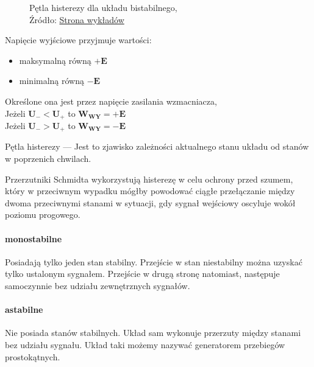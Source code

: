 \documentclass{article}
\begin{document}
\begin{figure}[!ht]
\begin{minipage}{.5\textwidth}
              \caption{Pętla histerezy dla układu bistabilnego,
              \\Źródło: \href{https://spe.if.uj.edu.pl/literatura}{Strona wykładów}}
              \label{fig7:histereza}
            \end{minipage}
            \end{figure}

          Napięcie wyjściowe przyjmuje wartości:
          \begin{itemize}
            \item maksymalną równą $\mathbf{+E}$
            \item minimalną równą $\mathbf{-E}$
          \end{itemize}

          Określone ona jest przez napięcie zasilania wzmacniacza, \\
          Jeżeli $\mathbf{U_- < U_+}$ to $\mathbf{W_{WY} = + E}$ \\
          Jeżeli $\mathbf{U_- > U_+}$ to $\mathbf{W_{WY} = - E}$ \\
          \pagebreak

          Pętla histerezy --- Jest to zjawisko zależności aktualnego stanu układu od stanów w poprzenich chwilach.

          Przerzutniki Schmidta wykorzystują histerezę w celu ochrony przed szumem, który w przeciwnym wypadku mógłby powodować ciągłe przełączanie między dwoma przeciwnymi stanami w sytuacji, gdy sygnał wejściowy oscyluje wokół poziomu progowego.

        \paragraph{monostabilne}
          \mbox{}\newline
          Posiadają tylko jeden stan stabilny. Przejście w stan niestabilny można uzyskać tylko ustalonym sygnałem. Przejście w drugą stronę natomiast, następuje samoczynnie bez udziału zewnętrznych sygnałów.

        \paragraph{astabilne}
          \mbox{}\newline
          Nie posiada stanów stabilnych. Układ sam wykonuje przerzuty między stanami bez udziału sygnału. Układ taki możemy nazywać generatorem przebiegów prostokątnych.
\end{document}
